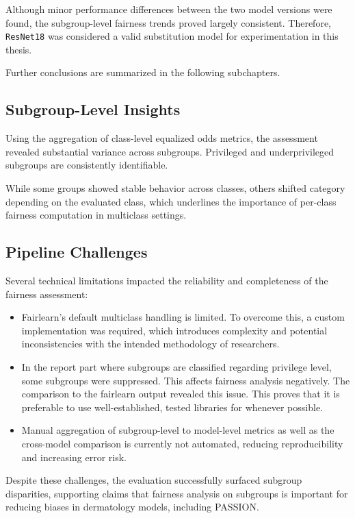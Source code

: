 \documentclass[12pt, a4paper, oneside]{book}   	%
\begin{document}
		Although minor performance differences between the two model versions were found, the subgroup-level fairness trends proved largely consistent. Therefore, \texttt{ResNet18} was considered a valid substitution model for experimentation in this thesis.
		
		Further conclusions are summarized in the following subchapters.
		
		\subsection{Subgroup-Level Insights}
		Using the aggregation of class-level equalized odds metrics, the assessment revealed substantial variance across subgroups. Privileged and underprivileged subgroups are consistently identifiable.
		
		While some groups showed stable behavior across classes, others shifted category depending on the evaluated class, which underlines the importance of per-class fairness computation in multiclass settings.
		
		\subsection{Pipeline Challenges}
		
		Several technical limitations impacted the reliability and completeness of the fairness assessment:
		\begin{itemize}
			\item Fairlearn’s default multiclass handling is limited. To overcome this, a custom implementation was required, which introduces complexity and potential inconsistencies with the intended methodology of researchers.
			\item In the report part where subgroups are classified regarding privilege level, some subgroups were suppressed. This affects fairness analysis negatively. The comparison to the fairlearn output revealed this issue. This proves that it is preferable to use well-established, tested libraries for whenever possible.
			\item Manual aggregation of subgroup-level to model-level metrics as well as the cross-model comparison is currently not automated, reducing reproducibility and increasing error risk.
		\end{itemize}
		
		Despite these challenges, the evaluation successfully surfaced subgroup disparities, supporting claims that fairness analysis on subgroups is important for reducing biases in dermatology models, including PASSION.
		
\end{document}

